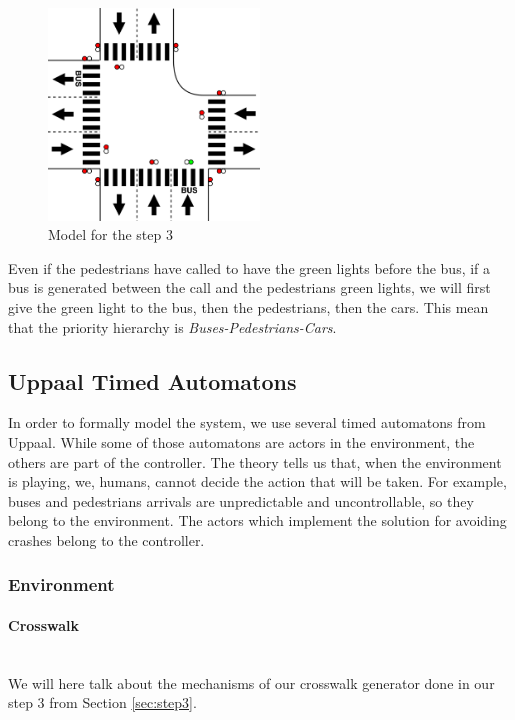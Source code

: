 \begin{figure}[H]\label{fig:step3bus}
  \centering
    \includegraphics[width=0.5\textwidth]{picture/model/trafficlight_step3_s2.png}
    \caption{Model for the step 3}
\end{figure}


\noindent Even if the pedestrians have called to have the green lights before the bus, if a bus is generated between the call and the pedestrians green lights, we will first give the green light to the bus, then the pedestrians, then the cars. This mean that the priority hierarchy is \textit{Buses-Pedestrians-Cars}.


\subsection{Uppaal Timed Automatons}
In order to formally model the system, we use several timed automatons from Uppaal. While some of those automatons are actors in the environment, the others are part of the controller.
The theory tells us that, when the environment is playing, we, humans, cannot decide the action that will be taken. For example, buses and pedestrians arrivals are unpredictable and uncontrollable, so they belong to the environment.
The actors which implement the solution for avoiding crashes belong to the controller. \\

\subsubsection{Environment}
\paragraph{Crosswalk} \mbox{}\\
We will here talk about the mechanisms of our crosswalk generator done in our step 3 from Section \ref{sec:step3}. \\

